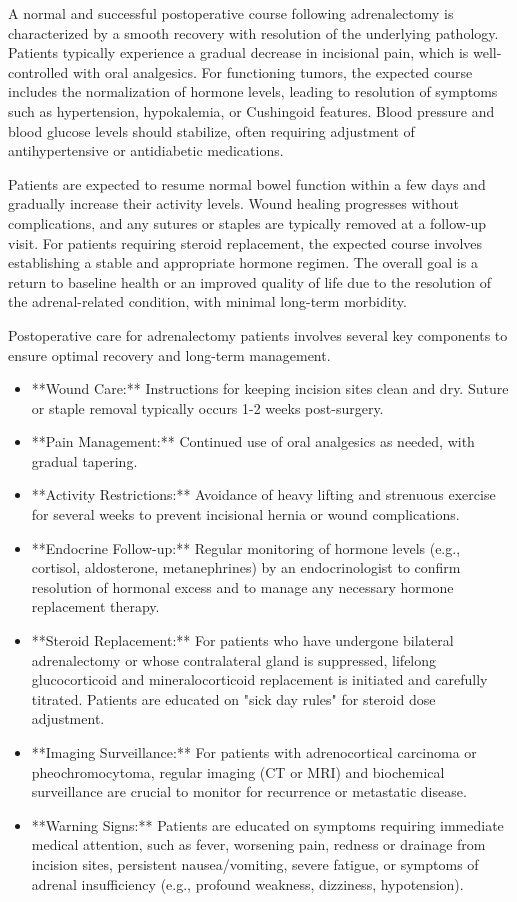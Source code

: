 A normal and successful postoperative course following adrenalectomy is characterized by a smooth recovery with resolution of the underlying pathology. Patients typically experience a gradual decrease in incisional pain, which is well-controlled with oral analgesics. For functioning tumors, the expected course includes the normalization of hormone levels, leading to resolution of symptoms such as hypertension, hypokalemia, or Cushingoid features. Blood pressure and blood glucose levels should stabilize, often requiring adjustment of antihypertensive or antidiabetic medications.

Patients are expected to resume normal bowel function within a few days and gradually increase their activity levels. Wound healing progresses without complications, and any sutures or staples are typically removed at a follow-up visit. For patients requiring steroid replacement, the expected course involves establishing a stable and appropriate hormone regimen. The overall goal is a return to baseline health or an improved quality of life due to the resolution of the adrenal-related condition, with minimal long-term morbidity.

Postoperative care for adrenalectomy patients involves several key components to ensure optimal recovery and long-term management.

\begin{itemize}
  \item **Wound Care:** Instructions for keeping incision sites clean and dry. Suture or staple removal typically occurs 1-2 weeks post-surgery.
  \item **Pain Management:** Continued use of oral analgesics as needed, with gradual tapering.
  \item **Activity Restrictions:** Avoidance of heavy lifting and strenuous exercise for several weeks to prevent incisional hernia or wound complications.
  \item **Endocrine Follow-up:** Regular monitoring of hormone levels (e.g., cortisol, aldosterone, metanephrines) by an endocrinologist to confirm resolution of hormonal excess and to manage any necessary hormone replacement therapy.
  \item **Steroid Replacement:** For patients who have undergone bilateral adrenalectomy or whose contralateral gland is suppressed, lifelong glucocorticoid and mineralocorticoid replacement is initiated and carefully titrated. Patients are educated on "sick day rules" for steroid dose adjustment.
  \item **Imaging Surveillance:** For patients with adrenocortical carcinoma or pheochromocytoma, regular imaging (CT or MRI) and biochemical surveillance are crucial to monitor for recurrence or metastatic disease.
  \item **Warning Signs:** Patients are educated on symptoms requiring immediate medical attention, such as fever, worsening pain, redness or drainage from incision sites, persistent nausea/vomiting, severe fatigue, or symptoms of adrenal insufficiency (e.g., profound weakness, dizziness, hypotension).
\end{itemize}

